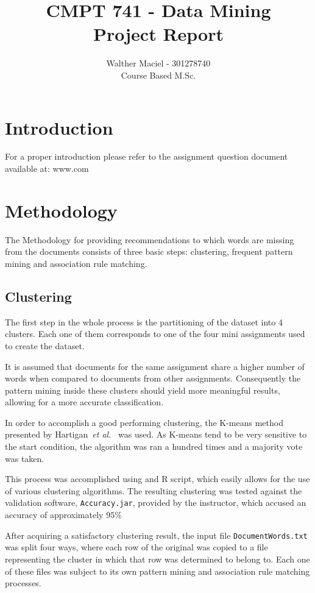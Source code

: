 \documentclass[11pt]{article}
\title{CMPT 741 - Data Mining\\ Project Report}
\author{Walther Maciel - 301278740\\ Course Based M.Sc.}
\begin{document}
\maketitle

\begin{multicols}{2}

\section{Introduction}
For a proper introduction please refer to the assignment question document available at: www.com

\section{Methodology}
The Methodology for providing recommendations to which words are missing from the documents consists of three basic steps: clustering, frequent pattern mining and association rule matching.


\subsection{Clustering}
The first step in the whole process is the partitioning of the dataset into 4 clusters. Each one of them corresponds to one of the four mini assignments used to create the dataset.

It is assumed that documents for the same assignment share a higher number of words when compared to documents from other assignments. Consequently the pattern mining inside these clusters should yield more meaningful results, allowing for a more accurate classification.

In order to accomplish a good performing clustering, the K-means  method presented by Hartigan~\emph{et al.}~\cite{hartigan79} was used. As K-means tend to be very sensitive to the start condition, the algorithm was ran a hundred times and a majority vote was taken.

This process was accomplished using and R script, which easily allows for the use of various clustering algorithms. The resulting clustering was tested against the validation software, \texttt{Accuracy.jar}, provided by the instructor, which accused an accuracy of approximately $95\%$

After acquiring a satisfactory clustering result, the input file \texttt{DocumentWords.txt} was split four ways, where each row of the original was copied to a file representing the cluster in which that row was determined to belong to. Each one of these files was subject to its own pattern mining and association rule matching processes.



\end{multicols}
\end{document}
